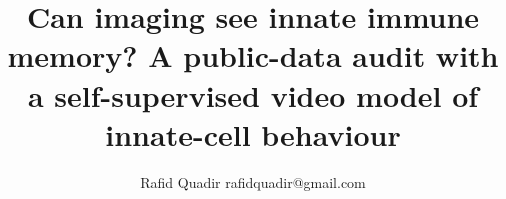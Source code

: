 \documentclass[10pt]{article}
\title{Can imaging see innate immune memory? A public-data audit with a
self-supervised video model of innate-cell behaviour}
\author{\name Rafid Quadir \email rafidquadir@gmail.com}
\begin{document}
\maketitle




\figcoverage



\figrestim

\figsignalling


\figbenchmarks
\figassoc
\figtraining


\figdesign








\appendix

\end{document}
